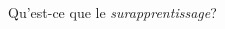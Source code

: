 \begin{frame}{\Large Qu'est-ce que le \textit{surapprentissage}?}
\begin{multicols}{2}
\begin{flushright}
\begin{minipage}{5.0cm}
	\end{minipage}
	\end{flushright}

\end{multicols}

\end{frame}
\normalsize

